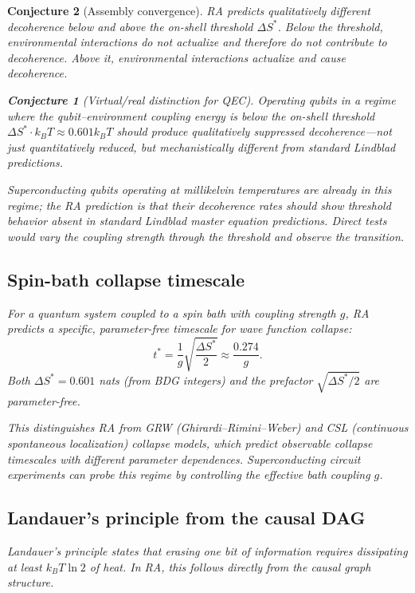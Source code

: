 \documentclass[11pt]{article}
\newtheorem{conjecture}{Conjecture}
\begin{document}
\begin{conjecture}[Assembly convergence]
RA predicts qualitatively different decoherence below and above the on-shell threshold $\Delta S^*$. Below the threshold, environmental interactions do not actualize and therefore do not contribute to decoherence. Above it, environmental interactions actualize and cause decoherence.

\begin{conjecture}[Virtual/real distinction for QEC]
Operating qubits in a regime where the qubit--environment coupling energy is below the on-shell threshold $\Delta S^* \cdot k_B T \approx 0.601 k_B T$ should produce qualitatively suppressed decoherence---not just quantitatively reduced, but mechanistically different from standard Lindblad predictions.
\end{conjecture}

Superconducting qubits operating at millikelvin temperatures are already in this regime; the RA prediction is that their decoherence rates should show threshold behavior absent in standard Lindblad master equation predictions. Direct tests would vary the coupling strength through the threshold and observe the transition.

\subsection{Spin-bath collapse timescale}
\label{sec:spinbath}

For a quantum system coupled to a spin bath with coupling strength $g$, RA predicts a specific, parameter-free timescale for wave function collapse:
\begin{equation}
\label{eq:spinbath}
\boxed{t^* = \frac{1}{g}\sqrt{\frac{\Delta S^*}{2}} \approx \frac{0.274}{g}.}
\end{equation}
Both $\Delta S^* = 0.601$ nats (from BDG integers) and the prefactor $\sqrt{\Delta S^*/2}$ are parameter-free.

This distinguishes RA from GRW (Ghirardi--Rimini--Weber) and CSL (continuous spontaneous localization) collapse models, which predict observable collapse timescales with different parameter dependences. Superconducting circuit experiments can probe this regime by controlling the effective bath coupling $g$.

\subsection{Landauer's principle from the causal DAG}
\label{sec:landauer}

Landauer's principle states that erasing one bit of information requires dissipating at least $k_B T \ln 2$ of heat. In RA, this follows directly from the causal graph structure.


\end{conjecture}
\end{document}
